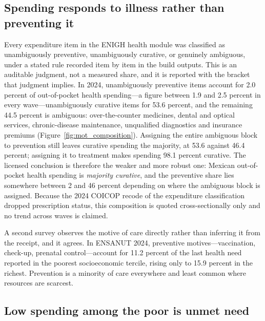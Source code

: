 \subsection{Spending responds to illness rather than preventing it}
\label{subsec:mot_curative}

Every expenditure item in the ENIGH health module was classified as
unambiguously preventive, unambiguously curative, or genuinely ambiguous, under
a stated rule recorded item by item in the build outputs. This is an auditable
judgment, not a measured share, and it is reported with the bracket that
judgment implies. In 2024, unambiguously preventive items account for 2.0
percent of out-of-pocket health spending---a figure between 1.9 and 2.5 percent
in every wave---unambiguously curative items for 53.6 percent, and the remaining
44.5 percent is ambiguous: over-the-counter medicines, dental and optical
services, chronic-disease maintenance, unqualified diagnostics and insurance
premiums (Figure~\ref{fig:mot_composition}). Assigning the entire ambiguous
block to prevention still leaves curative spending the majority, at 53.6 against
46.4 percent; assigning it to treatment makes spending 98.1 percent
curative. The licensed conclusion is therefore the weaker and more robust one:
Mexican out-of-pocket health spending is \emph{majority curative}, and the
preventive share lies somewhere between 2 and 46 percent depending on where the
ambiguous block is assigned. Because the 2024 COICOP recode of the expenditure
classification dropped prescription status, this composition is quoted
cross-sectionally only and no trend across waves is claimed.

A second survey observes the motive of care directly rather than inferring it
from the receipt, and it agrees. In ENSANUT 2024, preventive motives---vaccination, check-up, prenatal control---account for 11.2 percent of the last
health need reported in the poorest socioeconomic tercile, rising only to 15.9
percent in the richest. Prevention is a minority of care everywhere and least
common where resources are scarcest.

\subsection{Low spending among the poor is unmet need}
\label{subsec:mot_unmet}

